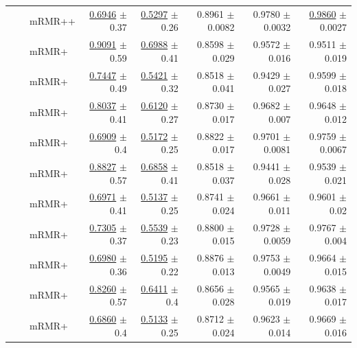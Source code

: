 \begin{longtable}{llp{}rrrrr}
 &  & mRMR++ & \underline{0.6946} {\scriptsize $\pm$ 0.37} & \underline{0.5297} {\scriptsize $\pm$ 0.26} & 0.8961 {\scriptsize $\pm$ 0.0082} & 0.9780 {\scriptsize $\pm$ 0.0032} & \underline{0.9860} {\scriptsize $\pm$ 0.0027} \\
 &  & mRMR+ & \underline{0.9091} {\scriptsize $\pm$ 0.59} & \underline{0.6988} {\scriptsize $\pm$ 0.41} & 0.8598 {\scriptsize $\pm$ 0.029} & 0.9572 {\scriptsize $\pm$ 0.016} & 0.9511 {\scriptsize $\pm$ 0.019} \\
 &  & mRMR+ & \underline{0.7447} {\scriptsize $\pm$ 0.49} & \underline{0.5421} {\scriptsize $\pm$ 0.32} & 0.8518 {\scriptsize $\pm$ 0.041} & 0.9429 {\scriptsize $\pm$ 0.027} & 0.9599 {\scriptsize $\pm$ 0.018} \\
 &  & mRMR+ & \underline{0.8037} {\scriptsize $\pm$ 0.41} & \underline{0.6120} {\scriptsize $\pm$ 0.27} & 0.8730 {\scriptsize $\pm$ 0.017} & 0.9682 {\scriptsize $\pm$ 0.007} & 0.9648 {\scriptsize $\pm$ 0.012} \\
 &  & mRMR+ & \underline{0.6909} {\scriptsize $\pm$ 0.4} & \underline{0.5172} {\scriptsize $\pm$ 0.25} & 0.8822 {\scriptsize $\pm$ 0.017} & 0.9701 {\scriptsize $\pm$ 0.0081} & 0.9759 {\scriptsize $\pm$ 0.0067} \\
 &  & mRMR+ & \underline{0.8827} {\scriptsize $\pm$ 0.57} & \underline{0.6858} {\scriptsize $\pm$ 0.41} & 0.8518 {\scriptsize $\pm$ 0.037} & 0.9441 {\scriptsize $\pm$ 0.028} & 0.9539 {\scriptsize $\pm$ 0.021} \\
 &  & mRMR+ & \underline{0.6971} {\scriptsize $\pm$ 0.41} & \underline{0.5137} {\scriptsize $\pm$ 0.25} & 0.8741 {\scriptsize $\pm$ 0.024} & 0.9661 {\scriptsize $\pm$ 0.011} & 0.9601 {\scriptsize $\pm$ 0.02} \\
 &  & mRMR+ & \underline{0.7305} {\scriptsize $\pm$ 0.37} & \underline{0.5539} {\scriptsize $\pm$ 0.23} & 0.8800 {\scriptsize $\pm$ 0.015} & 0.9728 {\scriptsize $\pm$ 0.0059} & 0.9767 {\scriptsize $\pm$ 0.004} \\
 &  & mRMR+ & \underline{0.6980} {\scriptsize $\pm$ 0.36} & \underline{0.5195} {\scriptsize $\pm$ 0.22} & 0.8876 {\scriptsize $\pm$ 0.013} & 0.9753 {\scriptsize $\pm$ 0.0049} & 0.9664 {\scriptsize $\pm$ 0.015} \\
 &  & mRMR+ & \underline{0.8260} {\scriptsize $\pm$ 0.57} & \underline{0.6411} {\scriptsize $\pm$ 0.4} & 0.8656 {\scriptsize $\pm$ 0.028} & 0.9565 {\scriptsize $\pm$ 0.019} & 0.9638 {\scriptsize $\pm$ 0.017} \\
 &  & mRMR+ & \underline{0.6860} {\scriptsize $\pm$ 0.4} & \underline{0.5133} {\scriptsize $\pm$ 0.25} & 0.8712 {\scriptsize $\pm$ 0.024} & 0.9623 {\scriptsize $\pm$ 0.014} & 0.9669 {\scriptsize $\pm$ 0.016} \\

\end{longtable}
